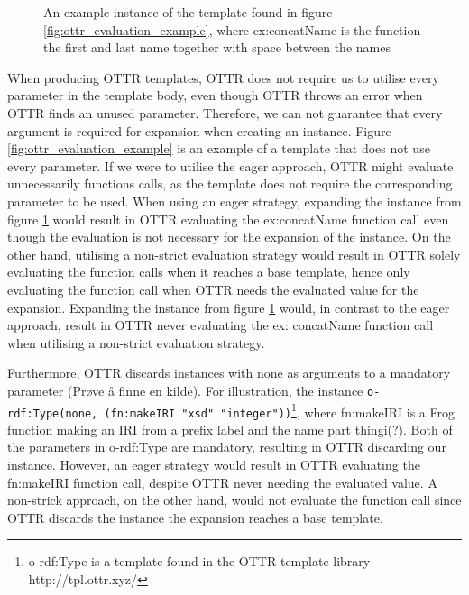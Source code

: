 \begin{figure}
    
    \caption{An example instance of the template found in figure \ref{fig:ottr_evaluation_example},  where ex:concatName is the function the first and last name together with space between the names}
    \label{fig:ottr_evaluation_example_usage}
\end{figure}
\para
When producing OTTR templates, OTTR does not require us to utilise every parameter in the template body, even though OTTR throws an error when OTTR finds an unused parameter. Therefore, we can not guarantee that every argument is required for expansion when creating an instance. 
Figure \ref{fig:ottr_evaluation_example} is an example of a template that does not use every parameter. If we were to utilise the eager approach, OTTR might evaluate unnecessarily functions calls, as the template does not require the corresponding parameter to be used. When using an eager strategy, expanding the instance from figure \ref{fig:ottr_evaluation_example_usage} would result in OTTR evaluating the ex:concatName function call even though the evaluation is not necessary for the expansion of the instance. On the other hand, utilising a non-strict evaluation strategy would result in OTTR solely evaluating the function calls when it reaches a base template, hence only evaluating the function call when OTTR needs the evaluated value for the expansion. Expanding the instance from figure \ref{fig:ottr_evaluation_example_usage} would, in contrast to the eager approach, result in OTTR never evaluating the ex: concatName function call when utilising a non-strict evaluation strategy. 

\para 
Furthermore, OTTR discards instances with none as arguments to a mandatory parameter (Prøve å finne en kilde). For illustration, the instance \lstinline{o-rdf:Type(none, (fn:makeIRI "xsd" "integer"))}\footnote{o-rdf:Type is a template found in the OTTR template library http://tpl.ottr.xyz/}, where fn:makeIRI is a Frog function making an IRI from a prefix label and the name part thingi(?). Both of the parameters in o-rdf:Type are mandatory, resulting in OTTR discarding our instance. However, an eager strategy would result in OTTR evaluating the fn:makeIRI function call, despite OTTR never needing the evaluated value. A non-strick approach, on the other hand, would not evaluate the function call since OTTR discards the instance the expansion reaches a base template.

